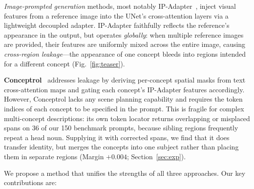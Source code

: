 \documentclass[review,10pt,times]{elsarticle}
\begin{document}
\textit{Image-prompted generation} methods, most notably
IP-Adapter~\cite{ye2023ip}, inject visual features from a reference
image into the UNet's cross-attention layers via a lightweight
decoupled adapter.  IP-Adapter faithfully reflects the reference's
appearance in the output, but operates \emph{globally}: when multiple
reference images are provided, their features are uniformly mixed
across the entire image, causing \emph{cross-region leakage}—the
appearance of one concept bleeds into regions intended for a different
concept (Fig.~\ref{fig:teaser}).

\textbf{Conceptrol}~\cite{he2025conceptrol} addresses leakage by
deriving per-concept spatial masks from text cross-attention maps and
gating each concept's IP-Adapter features accordingly.  However,
Conceptrol lacks any scene planning capability and requires the token indices
of each concept to be specified in the prompt.  This is fragile for complex
multi-concept descriptions: its own token locator returns overlapping or
misplaced spans on 36 of our 150 benchmark prompts, because sibling regions
frequently repeat a head noun.  Supplying it with corrected spans, we find that
it does transfer identity, but merges the concepts into one subject rather than
placing them in separate regions (Margin $+0.004$; Section~\ref{sec:exp}).

We propose a method that unifies the strengths of all three
approaches.  Our key contributions are:
\end{document}
